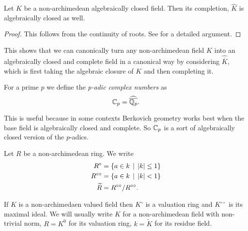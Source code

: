 \begin{theorem}
	Let $K$ be a non-archimedean algebraically closed field. 
	Then its completion, $\widehat K$ is algebraically closed as well. 
\end{theorem}
\begin{proof}
	This follows from the continuity of roots. See \cite[][lem A.6]{boschLecturesFormalRigid2014} for a detailed argument. 
\end{proof}

This shows that we can canonically turn any non-archimedean field $K$ into an algebraically closed and complete field in a canonical way by considering $\widehat{\overline{K}}$, which is first taking the algebraic closure of $K$ and then completing it. 

\begin{definition}
	For a prime $p$ we define the \emph{p-adic complex numbers} as \[
	\mathbb{C}_p = \widehat{\overline{\mathbb{Q}_p}}
	.\] 
\end{definition}

This is useful because in some contexts Berkovich geometry works best when the base field is algebraically closed and complete. 
So $\mathbb{C}_p$ is a sort of algebraically closed version of the $p$-adics. 

\begin{definition}
	Let $R$ be a non-archimedean ring. We write 
	\begin{align*}
		R^{\circ} &= \{a \in k \st |k| \le 1\}  \\
		R^{\circ\circ} &=  \{a \in k \st |k| < 1\}  \\
		\widetilde R &= R^{\circ\circ} / R^{\circ\circ}
	.\end{align*}
\end{definition}

If $K$ is a non-archimedaen valued field then $K^{\circ}$ is a valuation ring and $ K^{\circ\circ}$ is its maximal ideal. 
We will usually write $K$ for a non-archimedean field with non-trivial norm, $R = K^{0}$ for its valuation ring, $k = \widetilde K$ for its residue field. 

